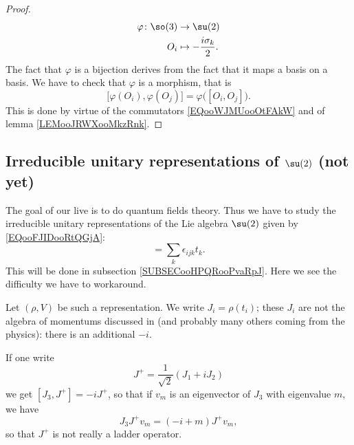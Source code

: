 \begin{proof}
\begin{equation}
        \begin{aligned}
            \varphi\colon \so(3)&\to \su(2) \\
            O_i&\mapsto -\frac{ i\sigma_k }{ 2 }. 
        \end{aligned}
    \end{equation}
    The fact that \( \varphi\) is a bijection derives from the fact that it maps a basis on a basis. We have to check that \( \varphi\) is a morphism, that is
    \begin{equation}
        \big[ \varphi(O_i),\varphi(O_j) \big]=\varphi\big( [O_i,O_j] \big).
    \end{equation}
    This is done by virtue of the commutators \eqref{EQooWJMUooOtFAkW} and of lemma \ref{LEMooJRWXooMkzRnk}.
\end{proof}

\subsection{Irreducible unitary representations of \texorpdfstring{$ \su(2)$}{su(2)} (not yet)}

The goal of our live is to do quantum fields theory. Thus we have to study the irreducible unitary representations of the Lie algebra \( \su(2)\) given by \eqref{EQooFJIDooRtQGjA}:
\begin{equation}
    [t_i,t_j]=\sum_k\epsilon_{ijk}t_k.
\end{equation}
This will be done in subsection \ref{SUBSECooHPQRooPvaRpJ}. Here we see the difficulty we have to workaround.

Let \( (\rho,V)\) be such a representation. We write \( J_i=\rho(t_i)\); these \( J_i\) are not the algebra of momentums discussed in \cite{BIBooYTTJooYpPYLT} (and probably many others coming from the physics): there is an additional \( -i\). 

If one write
\begin{equation}
    J^+=\frac{1}{ \sqrt{ 2 } }(J_1+iJ_2)
\end{equation}
we get \( [J_3,J^+]=-iJ^+\), so that if \( v_m\) is an eigenvector of \( J_3\) with eigenvalue \( m\), we have
\begin{equation}
    J_3J^+v_m=(-i+m)J^+v_m,
\end{equation}
so that \( J^+\) is not really a ladder operator.

